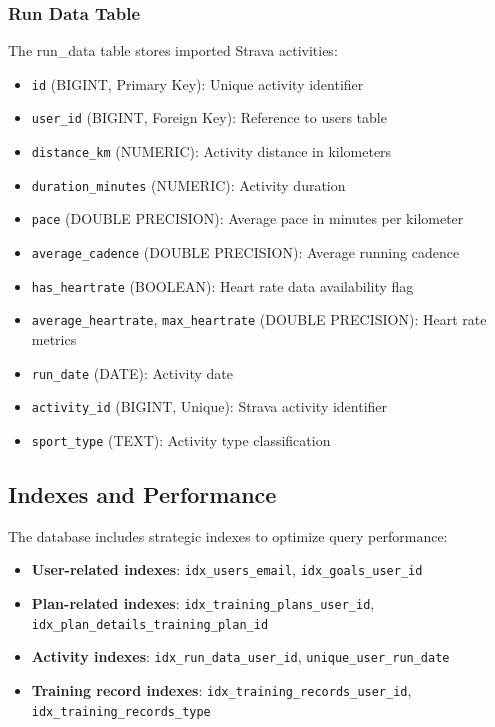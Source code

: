 \subsubsection{Run Data Table}
The run\_data table stores imported Strava activities:
\begin{itemize}
    \item \texttt{id} (BIGINT, Primary Key): Unique activity identifier
    \item \texttt{user\_id} (BIGINT, Foreign Key): Reference to users table
    \item \texttt{distance\_km} (NUMERIC): Activity distance in kilometers
    \item \texttt{duration\_minutes} (NUMERIC): Activity duration
    \item \texttt{pace} (DOUBLE PRECISION): Average pace in minutes per kilometer
    \item \texttt{average\_cadence} (DOUBLE PRECISION): Average running cadence
    \item \texttt{has\_heartrate} (BOOLEAN): Heart rate data availability flag
    \item \texttt{average\_heartrate}, \texttt{max\_heartrate} (DOUBLE PRECISION): Heart rate metrics
    \item \texttt{run\_date} (DATE): Activity date
    \item \texttt{activity\_id} (BIGINT, Unique): Strava activity identifier
    \item \texttt{sport\_type} (TEXT): Activity type classification
\end{itemize}

\subsection{Indexes and Performance}

The database includes strategic indexes to optimize query performance:

\begin{itemize}
    \item \textbf{User-related indexes}: \texttt{idx\_users\_email}, \texttt{idx\_goals\_user\_id}
    \item \textbf{Plan-related indexes}: \texttt{idx\_training\_plans\_user\_id}, \texttt{idx\_plan\_details\_training\_plan\_id}
    \item \textbf{Activity indexes}: \texttt{idx\_run\_data\_user\_id}, \texttt{unique\_user\_run\_date}
    \item \textbf{Training record indexes}: \texttt{idx\_training\_records\_user\_id}, \texttt{idx\_training\_records\_type}
\end{itemize}

